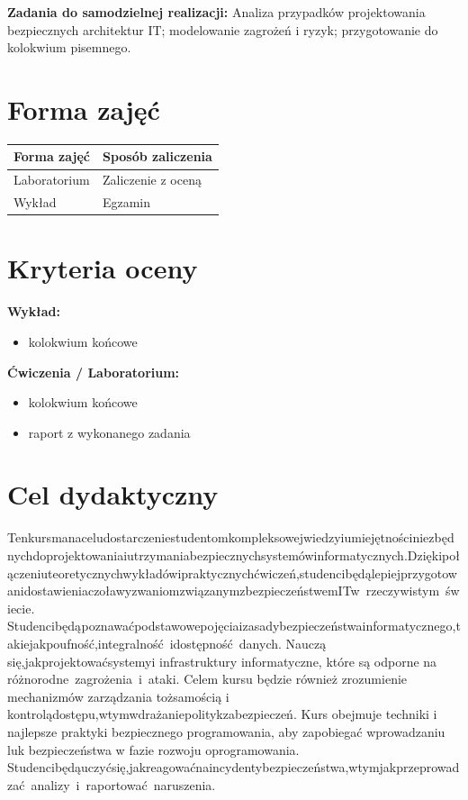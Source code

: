 \documentclass[12pt, a4paper]{article}
\newcommand{\thdrule}{\noalign{\global\setlength{\extrarowheight}{0pt}}}
\newcommand{\thdend}{\noalign{\global\setlength{\extrarowheight}{3pt}}}
\begin{document}
\vspace{4pt}
\noindent\textbf{Zadania do samodzielnej realizacji:} Analiza przypadków projektowania bezpiecznych architektur IT; modelowanie zagrożeń i ryzyk; przygotowanie do kolokwium pisemnego.

\section{Forma zajęć}

\begin{center}
{\scriptsize
\begin{tabular}{m{5cm}m{8cm}}
\thdrule\toprule
\rowcolor{pjatkRed} {\color{white}\textbf{Forma zajęć}} & {\color{white}\textbf{Sposób zaliczenia}} \\
\midrule\thdend
  \rowcolor{tableRowLight} Laboratorium & Zaliczenie z oceną \\
  \rowcolor{tableRowAlt} Wykład & Egzamin \\
\bottomrule
\end{tabular}}
\end{center}

\section{Kryteria oceny}

\textbf{Wykład:}
\begin{itemize}
  \item kolokwium końcowe
\end{itemize}
\vspace{4pt}
\textbf{Ćwiczenia / Laboratorium:}
\begin{itemize}
  \item kolokwium końcowe
  \item raport z wykonanego zadania
\end{itemize}


\section{Cel dydaktyczny}

Tenkursmanaceludostarczeniestudentomkompleksowejwiedzyiumiejętnościniezbędnychdoprojektowaniaiutrzymaniabezpiecznychsystemówinformatycznych.Dziękipołączeniuteoretycznychwykładówipraktycznychćwiczeń,studencibędąlepiejprzygotowanidostawieniaczoławyzwaniomzwiązanymzbezpieczeństwemITw rzeczywistym świecie. Studencibędąpoznawaćpodstawowepojęciaizasadybezpieczeństwainformatycznego,takiejakpoufność,integralność idostępność danych. Nauczą się,jakprojektowaćsystemyi infrastruktury informatyczne, które są odporne na różnorodne zagrożenia i ataki. Celem kursu będzie również zrozumienie mechanizmów zarządzania tożsamością i kontrolądostępu,wtymwdrażaniepolitykzabezpieczeń. Kurs obejmuje techniki i najlepsze praktyki bezpiecznego programowania, aby zapobiegać wprowadzaniu luk bezpieczeństwa w fazie rozwoju oprogramowania. Studencibędąuczyćsię,jakreagowaćnaincydentybezpieczeństwa,wtymjakprzeprowadzać analizy i raportować naruszenia.
\end{document}
